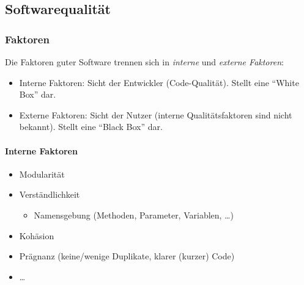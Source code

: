 \documentclass[
    ngerman,
    color=3b,
    summary,
    boxarc,
    main,
]{rubos-tuda-template}
\begin{document}
\subsection{Softwarequalität}
\subsubsection{Faktoren}
Die Faktoren guter Software trennen sich in \textit{interne} und \textit{externe Faktoren}:
\begin{itemize}
    \item Interne Faktoren: Sicht der Entwickler (Code-Qualität). Stellt eine \enquote{White Box} dar.
    \item Externe Faktoren: Sicht der Nutzer (interne Qualitätsfaktoren sind nicht bekannt). Stellt eine \enquote{Black Box} dar.
\end{itemize}
\paragraph{Interne Faktoren}
\begin{itemize}
    \item Modularität
    \item Verständlichkeit
          \begin{itemize}
              \item Namensgebung (Methoden, Parameter, Variablen, \dots)
          \end{itemize}
    \item Kohäsion
    \item Prägnanz (keine/wenige Duplikate, klarer (kurzer) Code)
    \item \dots
\end{itemize}
\end{document}
